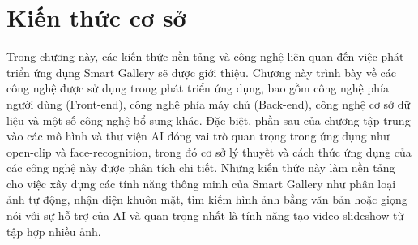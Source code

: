 \chapter{Kiến thức cơ sở}
Trong chương này, các kiến thức nền tảng và công nghệ liên quan đến việc phát triển ứng dụng Smart Gallery sẽ được giới thiệu. Chương này trình bày về các công nghệ được sử dụng trong phát triển ứng dụng, bao gồm công nghệ phía người dùng (Front-end), công nghệ phía máy chủ (Back-end), công nghệ cơ sở dữ liệu và một số công nghệ bổ sung khác. Đặc biệt, phần sau của chương tập trung vào các mô hình và thư viện AI đóng vai trò quan trọng trong ứng dụng như open-clip và face-recognition, trong đó cơ sở lý thuyết và cách thức ứng dụng của các công nghệ này được phân tích chi tiết. Những kiến thức này làm nền tảng cho việc xây dựng các tính năng thông minh của Smart Gallery như phân loại ảnh tự động, nhận diện khuôn mặt, tìm kiếm hình ảnh bằng văn bản hoặc giọng nói với sự hỗ trợ của AI và quan trọng nhất là tính năng tạo video slideshow từ tập hợp nhiều ảnh.














